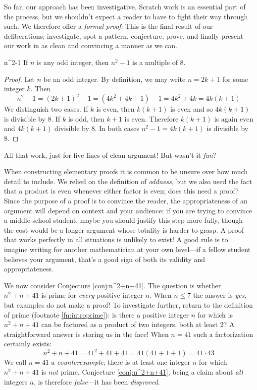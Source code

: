 So far, our approach has been investigative. Scratch work is an essential part of the process, but we shouldn't expect a reader to have to fight their way through such. We therefore offer a \emph{formal proof}. This is the final result of our deliberations; investigate, spot a pattern, conjecture, prove, and finally present our work in as clean and convincing a manner as we can.

\begin{thm}{}{n^2-1}
	If $n$ is any odd integer, then $n^2-1$ is a multiple of 8.
\end{thm}

\begin{proof}
	Let $n$ be an odd integer. By definition, we may write $n=2k+1$ for some integer $k$. Then
	\[
		n^2-1=(2k+1)^2-1=(4k^2+4k+1)-1=4k^2+4k=4k(k+1)
	\]
	We distinguish two cases. If $k$ is even, then $k(k+1)$ is even and so $4k(k+1)$ is divisible by 8.\smallbreak
	If $k$ is odd, then $k+1$ is even. Therefore $k(k+1)$ is again even and $4k(k+1)$ divisible by 8.\smallbreak
	In both cases $n^2-1=4k(k+1)$ is divisible by 8.
\end{proof}

All that work, just for five lines of clean argument! But wasn't it \emph{fun}?\medbreak

When constructing elementary proofs it is common to be unsure over how much detail to include. We relied on the definition of \emph{oddness,} but we also used the fact that a product is even whenever either factor is even; does this need a proof? Since the purpose of a proof is to convince the reader, the appropriateness of an argument will depend on context and your audience: if you are trying to convince a middle-school student, maybe you should justify this step more fully, though the cost would be a longer argument whose totality is harder to grasp. A proof that works perfectly in all situations is unlikely to exist! A good rule is to imagine writing for another mathematician at your own level---if a fellow student believes your argument, that's a good sign of both its validity and appropriateness.
\bigbreak

We now consider Conjecture \ref{conj:n^2+n+41}. The question is whether $n^2+n+41$ is prime for \emph{every} positive integer $n$. When $n\le 7$ the answer is \emph{yes}, but examples do not make a proof! To investigate further, return to the definition of prime (footnote \ref{fn:introprime}): is there a positive integer $n$ for which is $n^2+n+41$ can be factored as a product of two integers, both at least 2? A straightforward answer is staring us in the face! When $n=41$ such a factorization certainly exists:
\[
	n^2+n+41 =41^2+41+41 =41(41+1+1) =41\cdot 43
\]
We call $n=41$ a \emph{counterexample}; there is at least one integer $n$ for which $n^2+n+41$ is \emph{not} prime. Conjecture \ref{conj:n^2+n+41}, being a claim about \emph{all} integers $n$, is therefore \emph{false}---it has been \emph{disproved}.




